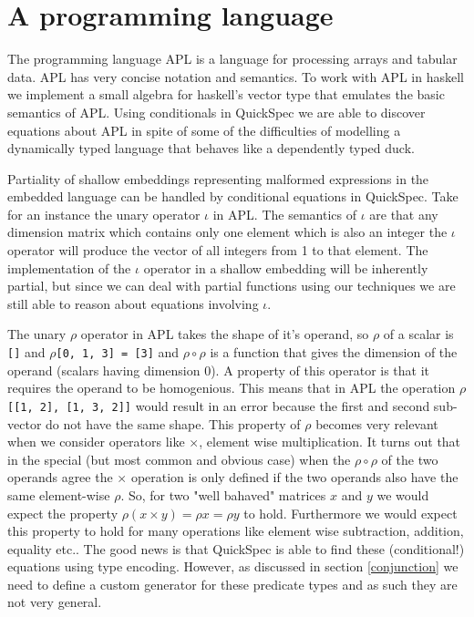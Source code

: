 \section{A programming language}\label{apl}
The programming language APL %
is a language for processing arrays and tabular data.
APL has very concise notation and semantics.
To work with APL in haskell we implement a small
algebra for haskell's vector type %
that emulates the basic semantics of APL.
Using conditionals in QuickSpec we are able to discover
equations about APL in spite of some of the
difficulties of modelling a dynamically typed language that 
behaves like a dependently typed duck.

Partiality of shallow embeddings representing malformed expressions in the
embedded language can be handled by conditional equations in QuickSpec.
Take for an instance the unary operator $\iota$ in APL. The semantics
of $\iota$ are that any dimension matrix which contains only one element which is also
an integer the $\iota$ operator will produce the vector of all integers from 1 to that element.
The implementation of the $\iota$ operator in a shallow embedding will be inherently partial,
but since we can deal with partial functions using our techniques we are still able to reason
about equations involving $\iota$.

The unary $\rho$ operator in APL takes the shape of it's operand,
so $\rho$ of a scalar is \texttt{[]} 
and $\rho$\texttt{[0, 1, 3] = [3]} and
$\rho\circ\rho$ is a function that gives the dimension of the operand (scalars having dimension 0).
A property of this operator is that it requires the operand to be homogenious.
This means that in APL the operation $\rho$\texttt{[[1, 2], [1, 3, 2]]}
would result in an error because the first and second sub-vector do not have the same shape.
This property of $\rho$ becomes very relevant when we consider operators like $\times$, element wise
multiplication. It turns out that in the special (but most common and obvious case)
when the $\rho\circ\rho$ of the two operands agree the $\times$ operation
is only defined if the two operands also have the same element-wise $\rho$. So, for two "well bahaved" matrices
$x$ and $y$ we would expect the property $\rho(x \times y) = \rho x = \rho y$ to hold. Furthermore
we would expect this property to hold for many operations like element wise subtraction, addition, equality etc..
The good news is that QuickSpec is able to find these (conditional!) equations using type encoding. However,
as discussed in section \ref{conjunction} we need to define a custom generator for these predicate types
and as such they are not very general.
